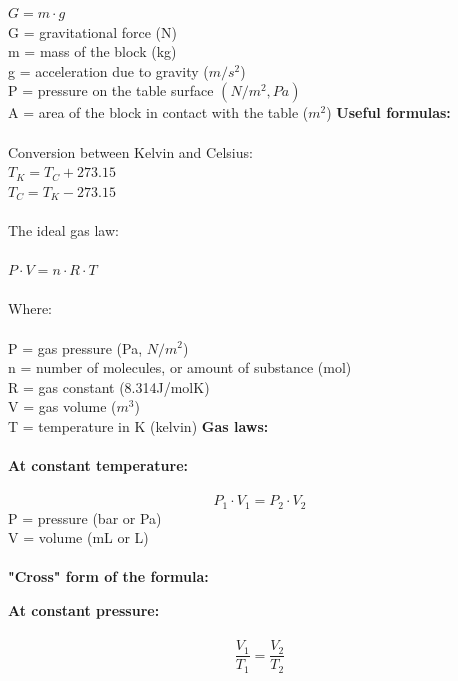 \documentclass[12pt,a4paper]{article}
\begin{document}
$G=m\cdot g$\\
G = gravitational force (N)\\
m = mass of the block (kg)\\
g = acceleration due to gravity ($m/s^2$)\\
P = pressure on the table surface $(N/m^2, Pa)$\\
A = area of the block in contact with the table ($m^2$)\newpage
\noindent\large\textbf{Useful formulas:}\\\\
Conversion between Kelvin and Celsius:\\
$T_K=T_C+273.15$\\
$T_C=T_K-273.15$\\\\
The ideal gas law:\\\\
$P\cdot V=n\cdot R\cdot T$\\\\
Where:\\\\
P = gas pressure (Pa, $N/m^2$)\\
n = number of molecules, or amount of substance (mol)\\
R = gas constant (8.314J/molK)\\
V = gas volume ($m^3$)\\
T = temperature in K (kelvin)\newpage
\noindent\large\textbf{Gas laws:}\\\\
\textbf{At constant temperature:}\\\\
$$P_1\cdot V_1=P_2\cdot V_2$$
P = pressure (bar or Pa)\\
V = volume (mL or L)\\\\
\textbf{"Cross" form of the formula:}\vspace{1cm}
\begin{center}
\end{center}
\textbf{At constant pressure:}\\\\
$$\frac{V_1}{T_1}=\frac{V_2}{T_2}$$\\
\end{document}
